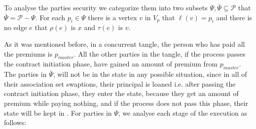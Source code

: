 To analyse the parties security we categorize them into two subsets $\Psi, \bar{\Psi} \subseteq \mathcal{P}$ that $\bar{\Psi} = \mathcal{P} - \Psi$. For each $p_i \in \Psi$ there is a vertex $v$ in $V_p$ that $\ell(v)=p_i$ and there is no edge $e$ that $\rho(e)$ is $x$ and $\tau(e)$ is $v$.


As it was mentioned before, in a concurrent tangle, the person who has paid all the premiums is $p_{master}$. All the other parties in the tangle, if the process passes the contract initiation phase, have gained an amount of premium from $p_{master}$. The parties in $\bar{\Psi}$, will not be in the \underwater state in any possible situation, since in all of their association set swaptions, their principal is loaned i.e. after passing the contract initiation phase, they enter the \freeride state, because they get an amount of premium while paying nothing, and if the process does not pass this phase, their state will be kept in \nodeal. For parties in $\Psi$, we analyse each stage of the execution as follows:

